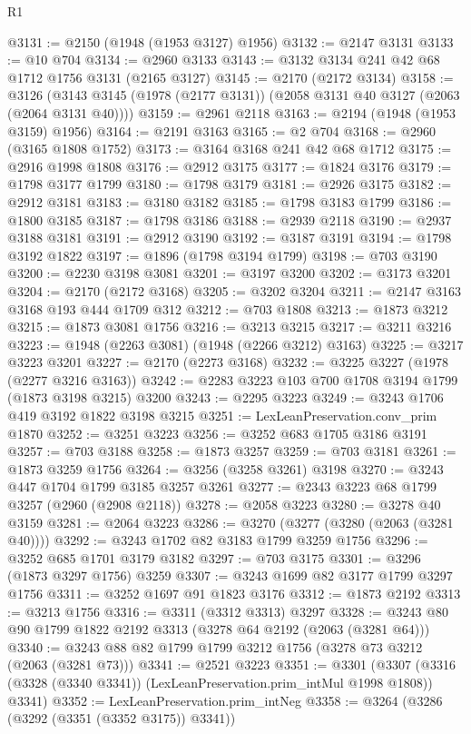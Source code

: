 \begin{lexlean}{R1}
\begin{coremodule}
@3131 := @2150 (@1948 (@1953 @3127) @1956)
@3132 := @2147 @3131
@3133 := @10 @704
@3134 := @2960 @3133
@3143 := @3132 @3134 @241 @42 @68 @1712 @1756 @3131 (@2165 @3127)
@3145 := @2170 (@2172 @3134)
@3158 := @3126 (@3143 @3145 (@1978 (@2177 @3131)) (@2058 @3131 @40 @3127 (@2063 (@2064 @3131 @40))))
@3159 := @2961 @2118
@3163 := @2194 (@1948 (@1953 @3159) @1956)
@3164 := @2191 @3163
@3165 := @2 @704
@3168 := @2960 (@3165 @1808 @1752)
@3173 := @3164 @3168 @241 @42 @68 @1712
@3175 := @2916 @1998 @1808
@3176 := @2912 @3175
@3177 := @1824 @3176
@3179 := @1798 @3177 @1799
@3180 := @1798 @3179
@3181 := @2926 @3175
@3182 := @2912 @3181
@3183 := @3180 @3182
@3185 := @1798 @3183 @1799
@3186 := @1800 @3185
@3187 := @1798 @3186
@3188 := @2939 @2118
@3190 := @2937 @3188 @3181
@3191 := @2912 @3190
@3192 := @3187 @3191
@3194 := @1798 @3192 @1822
@3197 := @1896 (@1798 @3194 @1799)
@3198 := @703 @3190
@3200 := @2230 @3198 @3081
@3201 := @3197 @3200
@3202 := @3173 @3201
@3204 := @2170 (@2172 @3168)
@3205 := @3202 @3204
@3211 := @2147 @3163 @3168 @193 @444 @1709 @312
@3212 := @703 @1808
@3213 := @1873 @3212
@3215 := @1873 @3081 @1756
@3216 := @3213 @3215
@3217 := @3211 @3216
@3223 := @1948 (@2263 @3081) (@1948 (@2266 @3212) @3163)
@3225 := @3217 @3223 @3201
@3227 := @2170 (@2273 @3168)
@3232 := @3225 @3227 (@1978 (@2277 @3216 @3163))
@3242 := @2283 @3223 @103 @700 @1708 @3194 @1799 (@1873 @3198 @3215) @3200
@3243 := @2295 @3223
@3249 := @3243 @1706 @419 @3192 @1822 @3198 @3215
@3251 := LexLeanPreservation.conv_prim @1870
@3252 := @3251 @3223
@3256 := @3252 @683 @1705 @3186 @3191
@3257 := @703 @3188
@3258 := @1873 @3257
@3259 := @703 @3181
@3261 := @1873 @3259 @1756
@3264 := @3256 (@3258 @3261) @3198
@3270 := @3243 @447 @1704 @1799 @3185 @3257 @3261
@3277 := @2343 @3223 @68 @1799 @3257 (@2960 (@2908 @2118))
@3278 := @2058 @3223
@3280 := @3278 @40 @3159
@3281 := @2064 @3223
@3286 := @3270 (@3277 (@3280 (@2063 (@3281 @40))))
@3292 := @3243 @1702 @82 @3183 @1799 @3259 @1756
@3296 := @3252 @685 @1701 @3179 @3182
@3297 := @703 @3175
@3301 := @3296 (@1873 @3297 @1756) @3259
@3307 := @3243 @1699 @82 @3177 @1799 @3297 @1756
@3311 := @3252 @1697 @91 @1823 @3176
@3312 := @1873 @2192
@3313 := @3213 @1756
@3316 := @3311 (@3312 @3313) @3297
@3328 := @3243 @80 @90 @1799 @1822 @2192 @3313 (@3278 @64 @2192 (@2063 (@3281 @64)))
@3340 := @3243 @88 @82 @1799 @1799 @3212 @1756 (@3278 @73 @3212 (@2063 (@3281 @73)))
@3341 := @2521 @3223
@3351 := @3301
    (@3307 (@3316 (@3328 (@3340 @3341)) (LexLeanPreservation.prim_intMul @1998 @1808)) @3341)
@3352 := LexLeanPreservation.prim_intNeg
@3358 := @3264 (@3286 (@3292 (@3351 (@3352 @3175)) @3341))

\end{coremodule}
\end{lexlean}
